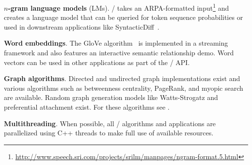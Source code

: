 \textbf{$n$-gram language models} (LMs).
\meta/ takes an ARPA-formatted
input\footnote{\url{http://www.speech.sri.com/projects/srilm/manpages/ngram-format.5.html}}
and creates a language model that can be queried for token sequence
probabilities or used in downstream applications like
SyntacticDiff~\cite{syndiff}.

\textbf{Word embeddings}.
The GloVe algorithm~\cite{glove} is implemented in a streaming framework and
also features an interactive semantic relationship demo. Word vectors can be
used in other applications as part of the \meta/ API\@.

\textbf{Graph algorithms}.
Directed and undirected graph implementations exist and various algorithms such
as betweenness centrality, PageRank, and myopic search are available. Random
graph generation models like Watts-Strogatz and preferential attachment exist.
For these algorithms see .

\textbf{Multithreading}.
When possible, all \meta/ algorithms and applications are parallelized using C++
threads to make full use of available resources.
